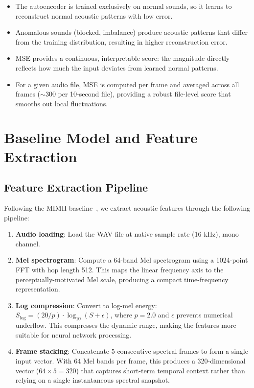 \documentclass[sigconf]{acmart}
\begin{document}
\begin{itemize}
    \item The autoencoder is trained exclusively on normal sounds, so it learns to reconstruct normal acoustic patterns with low error.
    \item Anomalous sounds (blocked, imbalance) produce acoustic patterns that differ from the training distribution, resulting in higher reconstruction error.
    \item MSE provides a continuous, interpretable score: the magnitude directly reflects how much the input deviates from learned normal patterns.
    \item For a given audio file, MSE is computed per frame and averaged across all frames ($\sim$300 per 10-second file), providing a robust file-level score that smooths out local fluctuations.
\end{itemize}

\section{Baseline Model and Feature Extraction}
\label{sec:baseline}

\subsection{Feature Extraction Pipeline}

Following the MIMII baseline~\cite{purohit2019mimii}, we extract acoustic features through the following pipeline:

\begin{enumerate}
    \item \textbf{Audio loading}: Load the WAV file at native sample rate (16 kHz), mono channel.
    \item \textbf{Mel spectrogram}: Compute a 64-band Mel spectrogram using a 1024-point FFT with hop length 512. This maps the linear frequency axis to the perceptually-motivated Mel scale, producing a compact time-frequency representation.
    \item \textbf{Log compression}: Convert to log-mel energy: $S_{\text{log}} = (20/p) \cdot \log_{10}(S + \epsilon)$, where $p = 2.0$ and $\epsilon$ prevents numerical underflow. This compresses the dynamic range, making the features more suitable for neural network processing.
    \item \textbf{Frame stacking}: Concatenate 5 consecutive spectral frames to form a single input vector. With 64 Mel bands per frame, this produces a 320-dimensional vector ($64 \times 5 = 320$) that captures short-term temporal context rather than relying on a single instantaneous spectral snapshot.
\end{enumerate}
\end{document}
